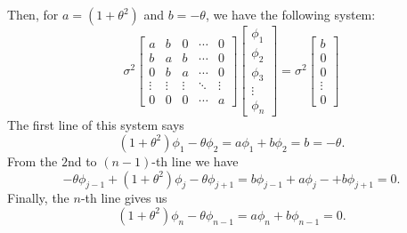 Then, for $a = (1 + \theta^2)$ and $b = -\theta$, we have the following system:
\[ \sigma^2 \left[  \begin{matrix}
    a & b & 0 & \cdots & 0\\
    b & a & b & \cdots & 0\\
    0 & b & a & \cdots & 0\\
    \vdots & \vdots & \vdots & \ddots & \vdots\\
    0 & 0 & 0 & \cdots & a 
\end{matrix} \right] 
\left[ \begin{matrix}
    \phi_1 \\ \phi_2 \\ \phi_3 \\ \vdots \\ \phi_n
\end{matrix} \right]
 = 
 \sigma^2 \left[ \begin{matrix}
    b \\ 0 \\ 0 \\ \vdots \\ 0
\end{matrix} \right]
\]
The first line of this system says
\[ (1+\theta^2) \phi_1 -\theta \phi_2 = a \phi_1 + b\phi_2 = b = -\theta. \]
From the $2$nd to $(n-1)$-th line we have 
\[ -\theta \phi_{j-1} + (1 + \theta^2) \phi_j - \theta \phi_{j+1} = b \phi_{j-1} + a \phi_j -+ b\phi_{j+1} = 0.\]
Finally, the $n$-th line gives us
\[ (1+\theta^2) \phi_{n} -\theta \phi_{n-1} = a \phi_n + b\phi_{n-1} = 0. \]